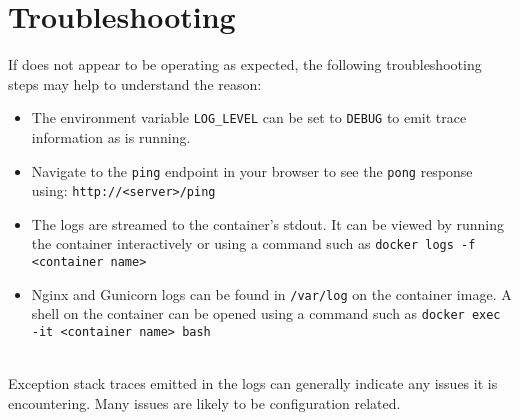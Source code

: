 \chapter{Troubleshooting}

If \cxoneflow does not appear to be operating as expected, the following
troubleshooting steps may help to understand the reason:

\begin{itemize}
    \item The environment variable \texttt{LOG\_LEVEL} can be set to \texttt{DEBUG}
    to emit trace information as \cxoneflow is running.

    \item Navigate to the \texttt{ping} endpoint in your browser to see the 
    \texttt{pong} response using: \texttt{http://<server>/ping}
    
    \item The \cxoneflow logs are streamed to the container's stdout.  It can be
    viewed by running the container interactively or using a command such as
    \texttt{docker logs -f <container name>}

    \item Nginx and Gunicorn logs can be found in \texttt{/var/log} on the container
    image.  A shell on the container can be opened using a command such as
    \texttt{docker exec -it <container name> bash}

\end{itemize}

\noindent\\Exception stack traces emitted in the \cxoneflow logs can generally
indicate any issues it is encountering.  Many issues are likely to be configuration
related.